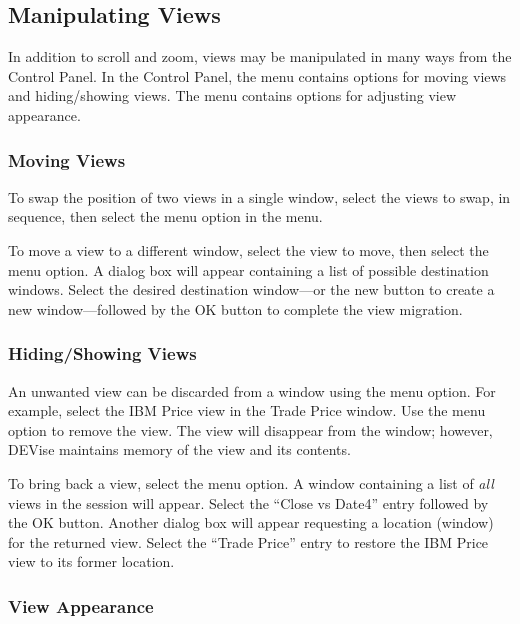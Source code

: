 
\subsection{Manipulating Views}

In addition to scroll and zoom, views may be manipulated in many ways from the
Control Panel. In the Control Panel, the  menu contains options for
moving views and hiding/showing views. The  menu contains options
for adjusting view appearance.

\subsubsection{Moving Views}

To swap the position of two views in a single window, select the views to
swap, in sequence, then select the  menu option in the
 menu.

To move a view to a different window, select the view to move, then select the
 menu option. A dialog box will appear containing a list of
possible destination windows. Select the desired destination window---or the new
button to create a new window---followed by the OK button to complete the view
migration.

\subsubsection{Hiding/Showing Views}

An unwanted view can be discarded from a window using the 
menu option. For example, select the IBM Price view in the Trade Price
window. Use the  menu option to remove the view. The view will
disappear from the window; however, DEVise maintains memory of the view and its
contents.

To bring back a view, select the  menu option. A window
containing a list of {\em all} views in the session will appear. Select the
``Close vs Date4'' entry followed by the OK button. Another dialog box will
appear requesting a location (window) for the returned view. Select the ``Trade
Price'' entry to restore the IBM Price view to its former location.

\subsubsection{View Appearance}

